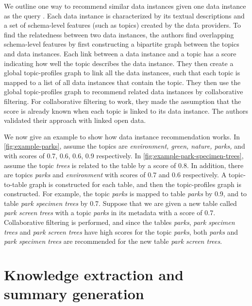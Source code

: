 We outline one way to recommend similar data instances given one data instance as the query \cite{conf/esws/EllefiBDT16}. Each data instance is characterized by its textual descriptions and a set of schema-level features (such as topics) created by the data providers. To find the relatedness between two data instances, the authors find overlapping schema-level features by first constructing a bipartite graph between the topics and data instances. Each link between a data instance and a topic has a score indicating how well the topic describes the data instance. They then create a global topic-profiles graph to link all the data instances, such that each topic is mapped to a list of all data instances that contain the topic. They then use the global topic-profiles graph to recommend related data instances by collaborative filtering. For collaborative filtering to work, they made the assumption that the score is already known when each topic is linked to its data instance. The authors validated their approach with linked open data.

We now give an example to show how data instance recommendation works. In \autoref{fig:example-parks}, assume the topics are \textit{environment, green, nature, parks,} and with scores of 0.7, 0.6, 0.6, 0.9 respectively. In \autoref{fig:example-park-specimen-trees}, assume the topic \textit{trees} is related to the table by a score of 0.8. In addition, there are topics \textit{parks} and \textit{environment} with scores of 0.7 and 0.6 respectively. A topic-to-table graph is constructed for each table, and then the topic-profiles graph is constructed. For example, the topic \textit{parks} is mapped to table \textit{parks} by 0.9, and to table \textit{park specimen trees} by 0.7. Suppose that we are given a new table called \textit{park screen trees} with a topic \textit{parks} in its metadata with a score of 0.7. Collaborative filtering is performed, and since the tables \textit{parks}, \textit{park specimen trees} and \textit{park screen trees} have high scores for the topic \textit{parks}, both \textit{parks} and \textit{park specimen trees} are recommended for the new table \textit{park screen trees}.

\section{Knowledge extraction and summary generation}
\label{sec:KnowledgeExtractionAndSummaryGeneration}

